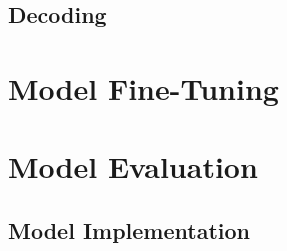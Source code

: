 \subsection{Decoding}

\section{Model Fine-Tuning}






\section{Model Evaluation}



\subsection{Model Implementation}


